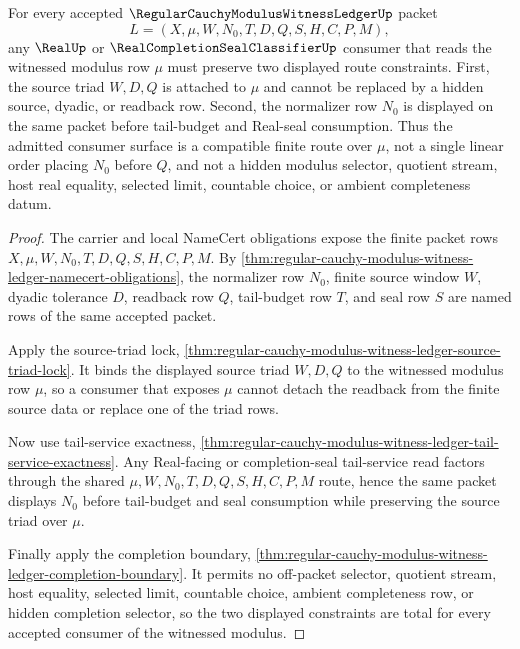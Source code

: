\begin{theorem}
\label{thm:regular-cauchy-modulus-witness-ledger-normalizer-source-totality}
For every accepted $\RegularCauchyModulusWitnessLedgerUp$ packet
$$
L=(X,\mu,W,N_0,T,D,Q,S,H,C,P,M),
$$
any $\RealUp$ or $\RealCompletionSealClassifierUp$ consumer that reads the witnessed modulus row $\mu$ must preserve two displayed route constraints. First, the source triad $W,D,Q$ is attached to $\mu$ and cannot be replaced by a hidden source, dyadic, or readback row. Second, the normalizer row $N_0$ is displayed on the same packet before tail-budget and Real-seal consumption. Thus the admitted consumer surface is a compatible finite route over $\mu$, not a single linear order placing $N_0$ before $Q$, and not a hidden modulus selector, quotient stream, host real equality, selected limit, countable choice, or ambient completeness datum.
\end{theorem}
\begin{proof}
The carrier and local NameCert obligations expose the finite packet rows $X,\mu,W,N_0,T,D,Q,S,H,C,P,M$. By \autoref{thm:regular-cauchy-modulus-witness-ledger-namecert-obligations}, the normalizer row $N_0$, finite source window $W$, dyadic tolerance $D$, readback row $Q$, tail-budget row $T$, and seal row $S$ are named rows of the same accepted packet.

Apply the source-triad lock, \autoref{thm:regular-cauchy-modulus-witness-ledger-source-triad-lock}. It binds the displayed source triad $W,D,Q$ to the witnessed modulus row $\mu$, so a consumer that exposes $\mu$ cannot detach the readback from the finite source data or replace one of the triad rows.

Now use tail-service exactness, \autoref{thm:regular-cauchy-modulus-witness-ledger-tail-service-exactness}. Any Real-facing or completion-seal tail-service read factors through the shared $\mu,W,N_0,T,D,Q,S,H,C,P,M$ route, hence the same packet displays $N_0$ before tail-budget and seal consumption while preserving the source triad over $\mu$.

Finally apply the completion boundary, \autoref{thm:regular-cauchy-modulus-witness-ledger-completion-boundary}. It permits no off-packet selector, quotient stream, host equality, selected limit, countable choice, ambient completeness row, or hidden completion selector, so the two displayed constraints are total for every accepted consumer of the witnessed modulus.
\end{proof}

